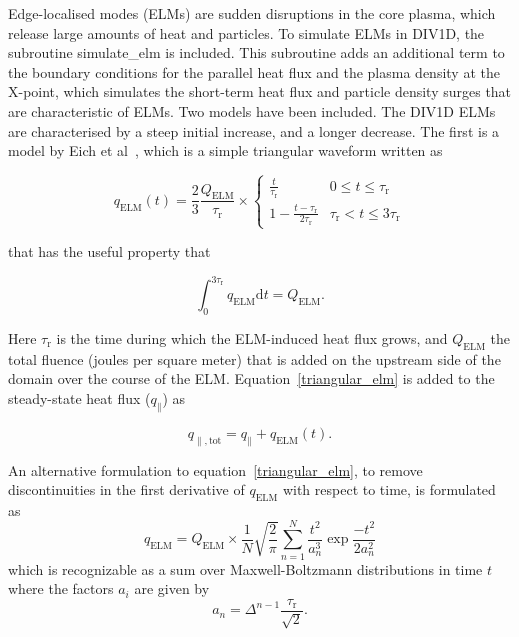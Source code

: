 \documentclass[amsmath,amssymb,a4]{revtex4-2}
\begin{document}
Edge-localised modes (ELMs) are sudden disruptions in the core plasma, which release large amounts of heat and particles. To simulate ELMs in DIV1D, the subroutine simulate\_elm is included. This subroutine adds an additional term to the boundary conditions for the parallel heat flux and the plasma density at the X-point, which simulates the short-term  heat flux and particle density surges that are characteristic of ELMs. Two models have been included. The DIV1D ELMs are characterised by a steep initial increase, and a longer decrease. The first is a model by Eich et al~\cite{eich2017}, which is a simple triangular waveform written as

\begin{equation}
\label{triangular_elm}
q_{\mathrm{ELM}}(t)=\frac{2}{3}\frac{Q_{\mathrm{ELM}}}{\tau_{\mathrm{r}}}\times
\left\{
\begin{matrix}
\frac{t}{\tau_{\mathrm{\mathrm{r}}}} &
0 \leq t \leq \tau_{\mathrm{r}} \\
1-\frac{t-\tau_{\mathrm{r}}}{2\tau_{\mathrm{r}}} &
\tau_{\mathrm{r}} < t \leq 3\tau_{\mathrm{r}}
\end{matrix}
\right.
\end{equation}

that has the useful property that

\begin{equation}
\int_{0}^{3\tau_{\mathrm{r}}} q_{\mathrm{ELM}} \mathrm{d}t=Q_{\mathrm{ELM}}.
\end{equation}

Here $\tau_{\mathrm{r}}$ is the time during which the ELM-induced heat flux grows, and $Q_{\mathrm{ELM}}$ the total fluence (joules per square meter) that is added on the upstream side of the domain over the course of the ELM. Equation~\ref{triangular_elm} is added to the steady-state heat flux ($q_{\parallel}$) as

\begin{equation}
\label{elm_boundary_condition}
q_{\parallel,\mathrm{tot}}=q_{\parallel}+q_{\mathrm{ELM}}(t).
\end{equation}

An alternative formulation to equation~\ref{triangular_elm}, to remove discontinuities in the first derivative of $q_{\mathrm{ELM}}$ with respect to time, is formulated as
\begin{equation}
\label{maxwell_boltzmann_elm}
q_{\mathrm{ELM}} = Q_{\mathrm{ELM}}\times
\frac{1}{N}\sqrt{\frac{2}{\pi}}
\sum_{n=1}^{N} \frac{t^2}{a_{n}^3}\exp{\frac{-t^2}{2a_n^2}}
\end{equation}
which is recognizable as a sum over Maxwell-Boltzmann distributions in time $t$ where the factors $a_i$ are given by
\begin{equation}
\label{maxwell_boltzmann_elm_a}
a_n = \Delta^{n-1}\frac{\tau_{\mathrm{r}}}{\sqrt{2}}.
\end{equation}
\end{document}
